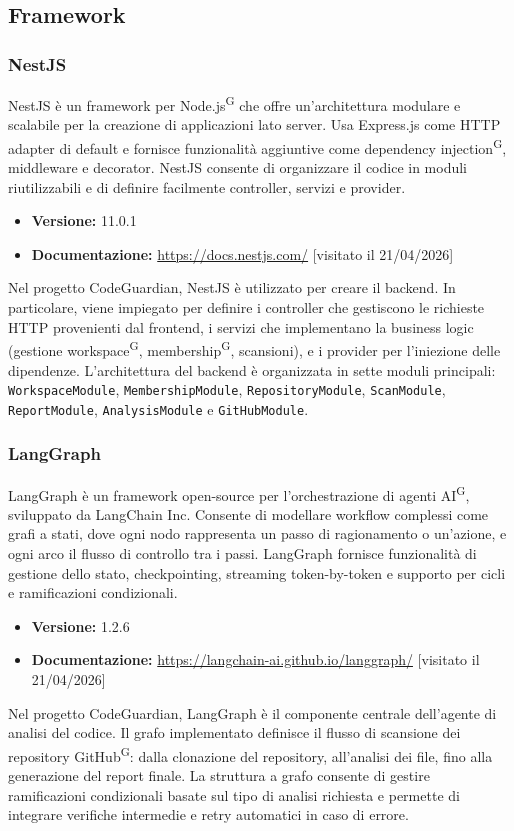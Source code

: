 \documentclass[a4paper, 11pt]{article}
\begin{document}
\subsection{Framework}

\subsubsection{NestJS}
NestJS è un framework per Node.js\textsuperscript{G} che offre un'architettura modulare e scalabile per la creazione di applicazioni lato server. Usa Express.js come HTTP adapter di default e fornisce funzionalità aggiuntive come dependency injection\textsuperscript{G}, middleware e decorator. NestJS consente di organizzare il codice in moduli riutilizzabili e di definire facilmente controller, servizi e provider.
\begin{itemize}
  \item \textbf{Versione:} 11.0.1
  \item \textbf{Documentazione:} \url{https://docs.nestjs.com/} [visitato il 21/04/2026]
\end{itemize}
Nel progetto CodeGuardian, NestJS è utilizzato per creare il backend. In particolare, viene impiegato per definire i controller che gestiscono le richieste HTTP provenienti dal frontend, i servizi che implementano la business logic (gestione workspace\textsuperscript{G}, membership\textsuperscript{G}, scansioni), e i provider per l'iniezione delle dipendenze. L'architettura del backend è organizzata in sette moduli principali: \texttt{WorkspaceModule}, \texttt{MembershipModule}, \texttt{RepositoryModule}, \texttt{ScanModule}, \texttt{ReportModule}, \texttt{AnalysisModule} e \texttt{GitHubModule}.

\subsubsection{LangGraph}
LangGraph è un framework open-source per l'orchestrazione di agenti AI\textsuperscript{G}, sviluppato da LangChain Inc. Consente di modellare workflow complessi come grafi a stati, dove ogni nodo rappresenta un passo di ragionamento o un'azione, e ogni arco il flusso di controllo tra i passi. LangGraph fornisce funzionalità di gestione dello stato, checkpointing, streaming token-by-token e supporto per cicli e ramificazioni condizionali.
\begin{itemize}
  \item \textbf{Versione:} 1.2.6
  \item \textbf{Documentazione:} \url{https://langchain-ai.github.io/langgraph/} [visitato il 21/04/2026]
\end{itemize}
Nel progetto CodeGuardian, LangGraph è il componente centrale dell'agente di analisi del codice. Il grafo implementato definisce il flusso di scansione dei repository GitHub\textsuperscript{G}: dalla clonazione del repository, all'analisi dei file, fino alla generazione del report finale. La struttura a grafo consente di gestire ramificazioni condizionali basate sul tipo di analisi richiesta e permette di integrare verifiche intermedie e retry automatici in caso di errore.
\end{document}
